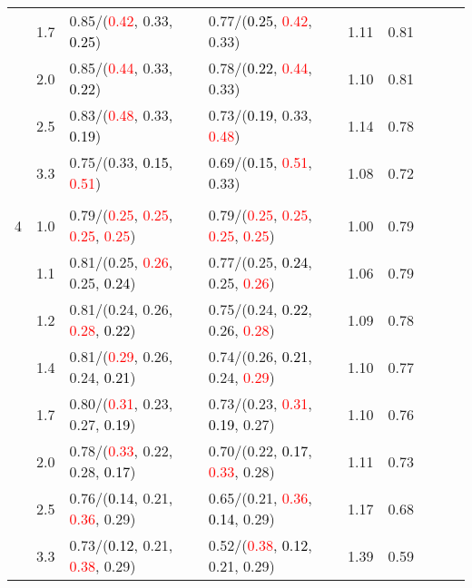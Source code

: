 \documentclass[10pt,a4paper]{report}
\begin{document}
\begin{table}[!htbp]
\begin{center}
{\begin{tabular}{ccllccccc}
			&1.7&0.85/(\textcolor{red}{0.42}, 0.33, \textcolor{black}{0.25})&0.77/(\textcolor{black}{0.25}, \textcolor{red}{0.42}, 0.33)&1.11&0.81\\
			&2.0&0.85/(\textcolor{red}{0.44}, 0.33, \textcolor{black}{0.22})&0.78/(\textcolor{black}{0.22}, \textcolor{red}{0.44}, 0.33)&1.10&0.81\\
			&2.5&0.83/(\textcolor{red}{0.48}, 0.33, \textcolor{black}{0.19})&0.73/(\textcolor{black}{0.19}, 0.33, \textcolor{red}{0.48})&1.14&0.78\\
			&3.3&0.75/(0.33, \textcolor{black}{0.15}, \textcolor{red}{0.51})&0.69/(\textcolor{black}{0.15}, \textcolor{red}{0.51}, 0.33)&1.08&0.72\\
			&&&&\\
			4			&1.0&0.79/(\textcolor{red}{0.25}, \textcolor{red}{0.25}, \textcolor{red}{0.25}, \textcolor{red}{0.25})&0.79/(\textcolor{red}{0.25}, \textcolor{red}{0.25}, \textcolor{red}{0.25}, \textcolor{red}{0.25})&1.00&0.79\\
			&1.1&0.81/(0.25, \textcolor{red}{0.26}, 0.25, \textcolor{black}{0.24})&0.77/(0.25, \textcolor{black}{0.24}, 0.25, \textcolor{red}{0.26})&1.06&0.79\\
			&1.2&0.81/(0.24, 0.26, \textcolor{red}{0.28}, \textcolor{black}{0.22})&0.75/(0.24, \textcolor{black}{0.22}, 0.26, \textcolor{red}{0.28})&1.09&0.78\\
			&1.4&0.81/(\textcolor{red}{0.29}, 0.26, 0.24, \textcolor{black}{0.21})&0.74/(0.26, \textcolor{black}{0.21}, 0.24, \textcolor{red}{0.29})&1.10&0.77\\
			&1.7&0.80/(\textcolor{red}{0.31}, 0.23, 0.27, \textcolor{black}{0.19})&0.73/(0.23, \textcolor{red}{0.31}, \textcolor{black}{0.19}, 0.27)&1.10&0.76\\
			&2.0&0.78/(\textcolor{red}{0.33}, 0.22, 0.28, \textcolor{black}{0.17})&0.70/(0.22, \textcolor{black}{0.17}, \textcolor{red}{0.33}, 0.28)&1.11&0.73\\
			&2.5&0.76/(\textcolor{black}{0.14}, 0.21, \textcolor{red}{0.36}, 0.29)&0.65/(0.21, \textcolor{red}{0.36}, \textcolor{black}{0.14}, 0.29)&1.17&0.68\\
			&3.3&0.73/(\textcolor{black}{0.12}, 0.21, \textcolor{red}{0.38}, 0.29)&0.52/(\textcolor{red}{0.38}, \textcolor{black}{0.12}, 0.21, 0.29)&1.39&0.59\\
			\bottomrule
		\end{tabular}}
	\end{center}
\end{table}
\end{document}
